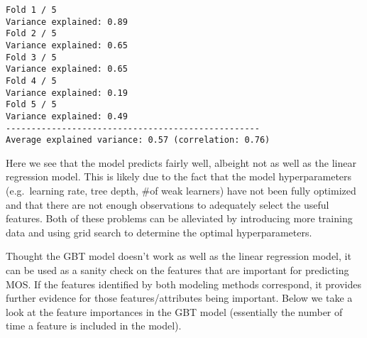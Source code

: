 \documentclass{article}
\begin{document}
    \begin{Verbatim}[commandchars=\\\{\}]
Fold 1 / 5
Variance explained: 0.89
Fold 2 / 5
Variance explained: 0.65
Fold 3 / 5
Variance explained: 0.65
Fold 4 / 5
Variance explained: 0.19
Fold 5 / 5
Variance explained: 0.49
--------------------------------------------------
Average explained variance: 0.57 (correlation: 0.76)
    \end{Verbatim}

    Here we see that the model predicts fairly well, albeight not as well as
the linear regression model. This is likely due to the fact that the
model hyperparameters (e.g.~learning rate, tree depth, \#of weak
learners) have not been fully optimized and that there are not enough
observations to adequately select the useful features. Both of these
problems can be alleviated by introducing more training data and using
grid search to determine the optimal hyperparameters.

Thought the GBT model doesn't work as well as the linear regression
model, it can be used as a sanity check on the features that are
important for predicting MOS. If the features identified by both
modeling methods correspond, it provides further evidence for those
features/attributes being important. Below we take a look at the feature
importances in the GBT model (essentially the number of time a feature
is included in the model).
\end{document}
